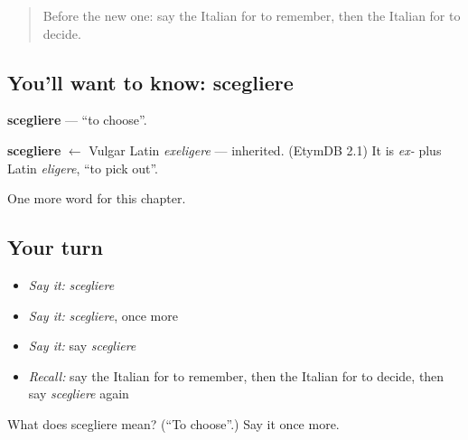 \begin{quote}
Before the new one: say the Italian for to remember, then the Italian for to decide.
\end{quote}

\subsection*{You'll want to know: scegliere}
\textbf{scegliere} — \textquotedblleft{}to choose\textquotedblright{}.

\begin{cousinweb}
\textbf{scegliere} $\leftarrow$ Vulgar Latin \emph{exeligere} — inherited. (EtymDB 2.1) It is \emph{ex-} plus Latin \emph{eligere}, \textquotedblleft{}to pick out\textquotedblright{}.
\end{cousinweb}

\begin{grammarlens}[title={What you've built}]
One more word for this chapter.
\end{grammarlens}

\subsection*{Your turn}
\begin{itemize}
\raggedright
  \item \emph{Say it:} \emph{scegliere}
  \item \emph{Say it:} \emph{scegliere}, once more
  \item \emph{Say it:} say \emph{scegliere}
  \item \emph{Recall:} say the Italian for to remember, then the Italian for to decide, then say \emph{scegliere} again
\end{itemize}

\begin{tcolorbox}[breakable,colback=teal!4,colframe=teal!35!black,title={Before you move on}]
What does scegliere mean? (\textquotedblleft{}To choose\textquotedblright{}.) Say it once more.
\end{tcolorbox}
